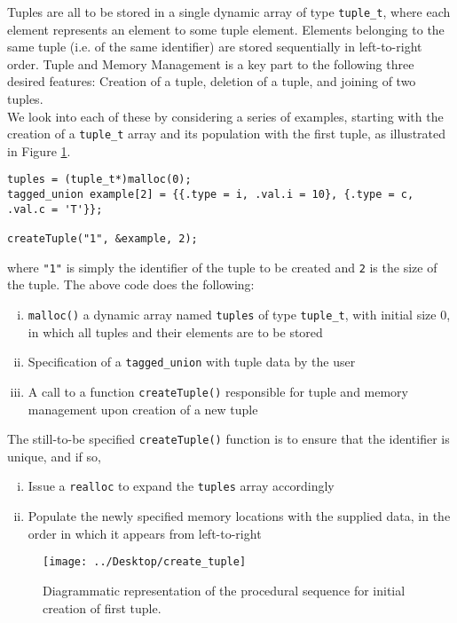 \documentclass[10pt, a4paper, oneside]{memoir}
\begin{document}
	Tuples are all to be stored in a single dynamic array of type \texttt{tuple_t}, where each element represents an element to some tuple element. Elements belonging to the same tuple (i.e. of the same identifier) are stored sequentially in left-to-right order. Tuple and Memory Management is a key part to the following three desired features: Creation of a tuple, deletion of a tuple, and joining of two tuples.\\

	We look into each of these by considering a series of examples, starting with the creation of a \texttt{tuple_t} array and its population with the first tuple, as illustrated in Figure \ref{fig:createtuple}.
	
\begin{verbatim}
tuples = (tuple_t*)malloc(0);
tagged_union example[2] = {{.type = i, .val.i = 10}, {.type = c, .val.c = 'T'}};

createTuple("1", &example, 2);
\end{verbatim}
	where \texttt{"1"} is simply the identifier of the tuple to be created and \texttt{2} is the size of the tuple. The above code does the following:
	\begin{enumerate}[i.]
		\item \texttt{malloc()} a dynamic array named \texttt{tuples} of type \texttt{tuple_t}, with initial size 0, in which all tuples and their elements are to be stored
		\item Specification of a \texttt{tagged_union} with tuple data by the user
		\item A call to a function \texttt{createTuple()} responsible for tuple and memory management upon creation of a new tuple
	\end{enumerate}

	The still-to-be specified \texttt{createTuple()} function is to ensure that the identifier is unique, and if so,
	\begin{enumerate}[i.]
		\item Issue a \texttt{realloc} to expand the \texttt{tuples} array accordingly
		\item Populate the newly specified memory locations with the supplied data, in the order in which it appears from left-to-right
	\end{enumerate}

	
	\begin{figure}[h]
		\centering
		\texttt{[image: ../Desktop/create\_tuple]}
		\caption{Diagrammatic representation of the procedural sequence for initial creation of first tuple.}
		\label{fig:createtuple}
	\end{figure}
\end{document}
